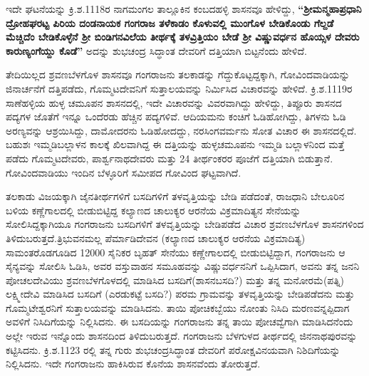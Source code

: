 ಇದೇ ಘಟನೆಯನ್ನು ಕ್ರಿ.ಶ.1118ರ ನಾಗಮಂಗಲ ತಾಲ್ಲೂಕಿನ ಕಂಬದಹಳ್ಳಿ ಶಾಸನವೂ ಹೇಳಿದ್ದು, \textbf{“ಶ‍್ರೀಮನ್ಮಹಾ\-ಪ್ರಧಾನಿ ದ್ರೋಹಘರಟ್ಟ ಪಿರಿಯ ದಂಡನಾಯಕ ಗಂಗರಾಜ ತಳೆಕಾಡಂ ಕೊಳುವಲ್ಲಿ ಮುಂಗೊಳ ಬೇಡಿಕೊಂಡು ಗೆಲ್ದಡೆ ಮೆಚ್ಚಿದೆಂ ಬೇಡಿಕೊಳ್ಳೆನೆ ಶ‍್ರೀ ಬಿಂಡಿಗನವಿಲೆಯ ತೀರ್ಥಕ್ಕೆ ತಳವ್ರಿತ್ತಿಯಂ ಬೇಡೆ ಶ‍್ರೀ ವಿಷ್ಣುವರ್ಧನ ಹೊಯ್ಸಳ ದೇವರು ಕಾರುಣ್ಯಂಗೆಯ್ದು ಕೊಡೆ” }ಅದನ್ನು ಶುಭಚಂದ್ರ ಸಿದ್ಧಾಂತ ದೇವರಿಗೆ ದತ್ತಿಯಾಗಿ ಬಿಟ್ಟನೆಂದು ಹೇಳಿದೆ.

ತೇದಿಯಿಲ್ಲದ ಶ್ರವಣಬೆಳಗೊಳ ಶಾಸನವೂ ಗಂಗರಾಜನು ತಲಕಾಡನ್ನು ಗೆದ್ದುಕೊಟ್ಟದ್ದಕ್ಕಾಗಿ, ಗೋವಿಂದವಾಡಿಯನ್ನು ಜಿನಾರ್ಚನೆಗೆ ದತ್ತಿಪಡೆದು, ಗೊಮ್ಮಟದೇವನಿಗೆ ಸುತ್ತಾಲಯವನ್ನು ನಿರ್ಮಿಸಿದ ವಿಚಾರವನ್ನು ಹೇಳಿದೆ. ಕ್ರಿ.ಶ.1119ರ ಸಾಣೆಹಳ್ಳಿಯ ಹುಳ್ಳ ಚಮೂಪನ ಶಾಸನದಲ್ಲಿ, ಇದೇ ವಿಚಾರವನ್ನು ವಿವರವಾಗಿದ್ದು ಹೇಳಿದ್ದು, ತಿಪ್ಪೂರು ಶಾಸನದ ಪದ್ಯಗಳ ಜೊತೆಗೆ ಇನ್ನೂ ಒಂದೆರಡು ಹೆಚ್ಚಿನ ಪದ್ಯಗಳಿವೆ. ಆದಿಯಮನು ಕಂಚಿಗೆ ಓಡಿಹೋಗಿದ್ದು, ತಿಗಳನು ಓಡಿ ಅರಣ್ಯವನ್ನು ಆಶ್ರಯಿಸಿದ್ದು, ದಾಮೋದರನು ಓಡಿಹೋದದ್ದು, ನರಸಿಂಗವರ್ಮನು ಸೋತ ವಿಚಾರ ಈ ಶಾಸನದಲ್ಲಿದೆ. ಬಹುಶಃ ಇಮ್ಮಡಿಬಲ್ಲಾಳನ ಕಾಲಕ್ಕೆ ಖಿಲವಾಗಿದ್ದ ಈ ದತ್ತಿಯನ್ನು ಹುಳ್ಳಚಮೂಪನು ಇಮ್ಮಡಿ ಬಲ್ಲಾಳನಿಂದ ಮತ್ತೆ ಪಡೆದು ಗೊಮ್ಮಟದೇವರು, ಪಾರ್ಶ್ವನಾಥದೇವರು ಮತ್ತು 24 ತೀರ್ಥಂಕರರ ಪೂಜೆಗೆ ದತ್ತಿಯಾಗಿ ಬಿಡುತ್ತಾನೆ. ಗೋವಿಂದವಾಡಿಯು ಇಂದಿನ ಬೆಳ್ಳೂರಿಗೆ ಸಮೀಪದ ಗೋವಿಂದ ಘಟ್ಟವಾಗಿದೆ.

ತಲಕಾಡು ವಿಜಯಕ್ಕಾಗಿ ಜೈನತೀರ್ಥಗಳಿಗೆ ಬಸದಿಗಳಿಗೆ ತಳವೃತ್ತಿಯನ್ನು ಬೇಡಿ ಪಡೆದಂತೆ, ರಾಜಧಾನಿ ಬೇಲೂರಿನ ಬಳಿಯ ಕಣ್ಣೆಗಾಲದಲ್ಲಿ ಬೀಡುಬಿಟ್ಟಿದ್ದ ಕಲ್ಯಾಣದ ಚಾಲುಕ್ಯರ ಆರನೆಯ ವಿಕ್ರಮಾದಿತ್ಯನ ಸೇನೆಯನ್ನು ಸೋಲಿಸಿದ್ದಕ್ಕಾಗಿಯೂ ಗಂಗರಾಜನು ಬಸದಿಗಳಿಗೆ ತಳವೃತ್ತಿಯನ್ನು ಬೇಡಿಪಡೆದ ವಿಚಾರ ಶ್ರವಣಬೆಳಗೊಳ ಶಾಸನಗಳಿಂದ ತಿಳಿದುಬರುತ್ತದೆ.\break ತ್ರಿಭುವನಮಲ್ಲ ಪೆರ್ಮಾಡಿದೇವನ (ಕಲ್ಯಾಣದ ಚಾಲುಕ್ಯರ ಆರನೆಯ ವಿಕ್ರಮಾದಿತ್ಯ) ಸಾಮಂತರೊಡಗೂಡಿದ 12000 ಸೈನಿಕರ ಬೃಹತ್​ ಸೇನೆಯು ಕಣ್ಣೇಗಾಲದಲ್ಲಿ ಬೀಡುಬಿಟ್ಟಿದ್ದಾಗ, ಗಂಗರಾಜನು ಆ ಸೈನ್ಯವನ್ನು ಸೋಲಿಸಿ ಓಡಿಸಿ, ಅವರ ವಸ್ತುವಾಹನ ಸಮೂಹವನ್ನು ವಿಷ್ಣುವರ್ಧನನಿಗೆ ಒಪ್ಪಿಸಿದಾಗ, ಅವನು ತನ್ನ ಜನನಿ ಪೋಚಲದೇವಿಯು ಶ್ರವಣಬೆಳಗೊಳದಲ್ಲಿ ಮಾಡಿಸಿದ ಬಸದಿಗೆ(ಶಾಸನಬಸದಿ?) ಮತ್ತು ತನ್ನ ಮನೋರಮೆ(ಪತ್ನಿ) ಲಕ್ಷ್ಮೀದೇವಿ ಮಾಡಿಸಿದ ಬಸದಿಗೆ (ಎರಡುಕಟ್ಟೆ ಬಸದಿ?) ಪರಮ ಗ್ರಾಮವನ್ನು ತಳವೃತ್ತಿಯನ್ನು ಬೇಡಿಪಡೆದನು ಮತ್ತು ಗೊಮ್ಮಟೇಶ್ವರನಿಗೆ ಸುತ್ತಾಲಯವನ್ನು ಮಾಡಿಸಿದನು. ತಾಯಿ ಪೋಚಿಕಬ್ಬೆಯು ನೋಂತು ನಿಸಿದಿ ಮರಣವನ್ನಪ್ಪಿದಾಗ ಅವಳಿಗೆ ನಿಸಿದಿಗೆಯನ್ನು ನಿಲ್ಲಿಸಿದನು. ಈ ಬಸದಿಯನ್ನು ಗಂಗರಾಜನು ತನ್ನ ತಾಯಿ ಪೋಚವ್ವೆಗಾಗಿ ಮಾಡಿಸಿದನೆಂದು ಅಲ್ಲೇ ಇರುವ ಇನ್ನೊಂದು ಶಾಸನದಿಂದ ತಿಳಿದುಬರುತ್ತದೆ. ಗಂಗರಾಜನು ಬೆಳಗುಳದ ತೀರ್ಥದಲ್ಲಿ ಜಿನನಾಥಪುರವನ್ನು ಕಟ್ಟಿಸಿದನು. ಕ್ರಿ.ಶ.1123 ರಲ್ಲಿ ತನ್ನ ಗುರು ಶುಭಚಂದ್ರಸಿದ್ಧಾಂತ ದೇವರಿಗೆ ಪರೋಕ್ಷವಿನಯವಾಗಿ ನಿಶಿದಿಗೆಯನ್ನು ನಿಲ್ಲಿಸಿದನು. ಇದೇ ಗಂಗರಾಜನು ಹಾಕಿಸಿರುವ ಕೊನೆಯ ಶಾಸನವೆಂದು ತೋರುತ್ತದೆ.

